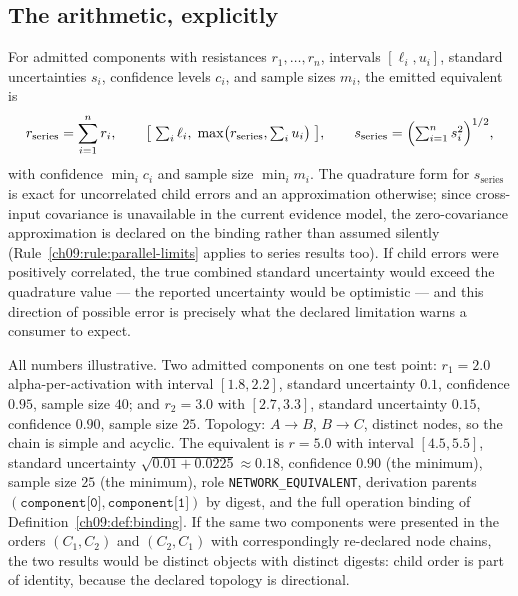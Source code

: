 \subsection{The arithmetic, explicitly}

For admitted components with resistances $r_1, \ldots, r_n$, intervals
$[\ell_i, u_i]$, standard uncertainties $s_i$, confidence levels $c_i$,
and sample sizes $m_i$, the emitted equivalent is
\[
r_{\mathrm{series}} = \sum_{i=1}^{n} r_i, \qquad
\bigl[\;\textstyle\sum_i \ell_i,\; \max\bigl(r_{\mathrm{series}},
\sum_i u_i\bigr)\;\bigr], \qquad
s_{\mathrm{series}} = \Bigl(\sum_{i=1}^{n} s_i^2\Bigr)^{1/2},
\]
with confidence $\min_i c_i$ and sample size $\min_i m_i$. The
quadrature form for $s_{\mathrm{series}}$ is exact for uncorrelated
child errors and an approximation otherwise; since cross-input
covariance is unavailable in the current evidence model, the zero-covariance
approximation is declared on the binding rather than assumed silently
(Rule~\ref{ch09:rule:parallel-limits} applies to series results too).
If child errors were positively correlated, the true combined standard
uncertainty would exceed the quadrature value --- the reported
uncertainty would be optimistic --- and this direction of possible error
is precisely what the declared limitation warns a consumer to expect.

\begin{example}\label{ch09:ex:series}
All numbers illustrative. Two admitted components on one test point:
$r_1 = 2.0$ alpha-per-activation with interval $[1.8, 2.2]$, standard
uncertainty $0.1$, confidence $0.95$, sample size $40$; and $r_2 = 3.0$
with $[2.7, 3.3]$, standard uncertainty $0.15$, confidence $0.90$,
sample size $25$. Topology: $A \to B$, $B \to C$, distinct nodes, so the
chain is simple and acyclic. The equivalent is $r = 5.0$ with interval
$[4.5, 5.5]$, standard uncertainty $\sqrt{0.01 + 0.0225} \approx 0.18$,
confidence $0.90$ (the minimum), sample size $25$ (the minimum), role
\texttt{NETWORK\_EQUIVALENT}, derivation parents
$(\texttt{component[0]}, \texttt{component[1]})$ by digest, and the full
operation binding of Definition~\ref{ch09:def:binding}. If the same two
components were presented in the orders $(C_1, C_2)$ and $(C_2, C_1)$
with correspondingly re-declared node chains, the two results would be
distinct objects with distinct digests: child order is part of identity,
because the declared topology is directional.
\end{example}

